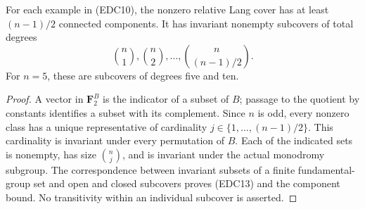 \begin{corollary}
\label{cor:root-primitive-permutation-Lang-components}
For each example in (EDC10), the nonzero relative Lang cover
has at least \((n-1)/2\) connected components. It has invariant
nonempty subcovers of total degrees
\[
                       \binom n1,\binom n2,\ldots,
                              \binom n{(n-1)/2}.     \tag{EDC13}
\]
For \(n=5\), these are subcovers of degrees five and ten.
\end{corollary}
\begin{proof}
A vector in \(\mathbf F_2^B\) is the indicator of a subset
of \(B\); passage to the quotient by constants identifies a
subset with its complement. Since \(n\) is odd, every nonzero
class has a unique representative of cardinality
\(j\in\{1,\ldots,(n-1)/2\}\). This cardinality is invariant
under every permutation of \(B\). Each of the indicated sets
is nonempty, has size \(\binom nj\), and is invariant under
the actual monodromy subgroup. The correspondence between
invariant subsets of a finite fundamental-group set and open
and closed subcovers proves (EDC13) and the component bound.
No transitivity within an individual subcover is asserted.
\end{proof}

